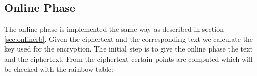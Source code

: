 \subsection{Online Phase}
The online phase is implemented the same way as described in section \ref{sec:onlinerb}. Given the ciphertext and the corresponding text we calculate the key used for the encryption. The initial step is to give the online phase the text and the ciphertext. From the ciphertext certain points are computed which will be checked with the rainbow table:



